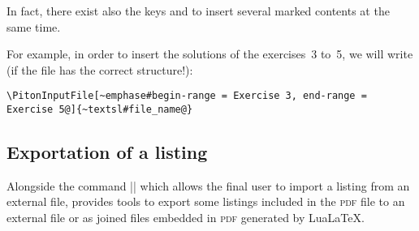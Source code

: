 \documentclass{article}
\begin{document}
\bigskip
{}
In fact, there exist also the keys  and
 to insert several marked contents at the same time.

For example, in order to insert the solutions of the exercises~3 to~5, we will
write (if the file has the correct structure!):


\begin{Verbatim}
\PitonInputFile[~emphase#begin-range = Exercise 3, end-range = Exercise 5@]{~textsl#file_name@}
\end{Verbatim}


\subsection{Exportation of a listing}

Alongside the command |\PitonInputFile| which allows the final user to import a
listing from an external file,  provides tools to export some listings
included in the \textsc{pdf} file to an external file or as joined files embedded in
\textsc{pdf} generated by LuaLaTeX.
\end{document}
